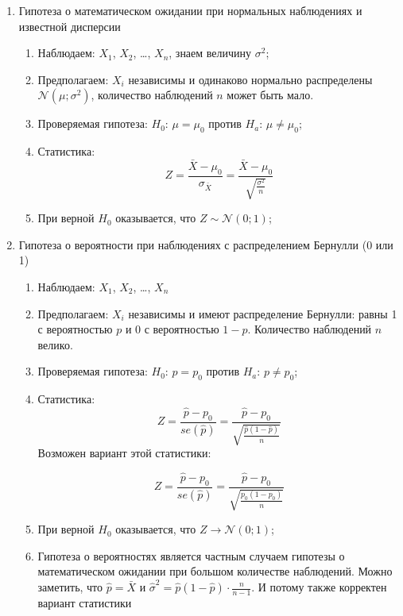 \documentclass[12pt, a4paper]{article}
\def \cN{\mathcal{N}}
\begin{document}
\begin{enumerate}
  \item Гипотеза о математическом ожидании при нормальных наблюдениях и известной дисперсии
    \begin{enumerate}

      \item Наблюдаем: $X_1$, $X_2$, \ldots, $X_n$, знаем величину $\sigma^2$;

      \item Предполагаем: $X_i$ независимы и одинаково нормально распределены $\cN(\mu; \sigma^2)$, количество наблюдений $n$ может быть мало.

      \item Проверяемая гипотеза: $H_0$: $\mu = \mu_0$ против $H_a$: $\mu \neq \mu_0$;

      \item Статистика:
	\[
	  Z = \frac{\bar X - \mu_0}{\sigma_{\bar X}} = \frac{\bar X - \mu_0}{\sqrt{\frac{\sigma^2}{n}}}
	\]

      \item При верной $H_0$ оказывается, что $Z \sim \cN(0;1)$;


    \end{enumerate}



  \item Гипотеза о вероятности при наблюдениях с распределением Бернулли (0 или 1)
  \begin{enumerate}

      \item Наблюдаем: $X_1$, $X_2$, \ldots, $X_n$

      \item Предполагаем: $X_i$ независимы и имеют распределение Бернулли: равны 1 с вероятностью $p$ и 0 с вероятностью $1-p$. Количество наблюдений $n$ велико.

      \item Проверяемая гипотеза: $H_0$: $p = p_0$ против $H_a$: $p \neq p_0$;

      \item Статистика:
	\[
	  Z = \frac{\hat p - p_0}{se(\hat p)} = \frac{\hat p - p_0}{\sqrt{\frac{\hat p (1- \hat p)}{n}}}
      \]
      Возможен вариант этой статистики:

	\[
	  Z = \frac{\hat p - p_0}{se(\hat p)} = \frac{\hat p - p_0}{\sqrt{\frac{p_0 (1- p_0 )}{n}}}
      \]


     \item При верной $H_0$ оказывается, что $Z \to \cN(0;1)$;

     \item Гипотеза о вероятностях является частным случаем гипотезы о математическом ожидании при большом количестве наблюдений. Можно заметить, что $\hat p = \bar X$ и $\hat \sigma^2 = \hat p (1- \hat p) \cdot \frac{n}{n-1}$. И потому также корректен вариант статистики


\end{enumerate}
\end{enumerate}
\end{document}
